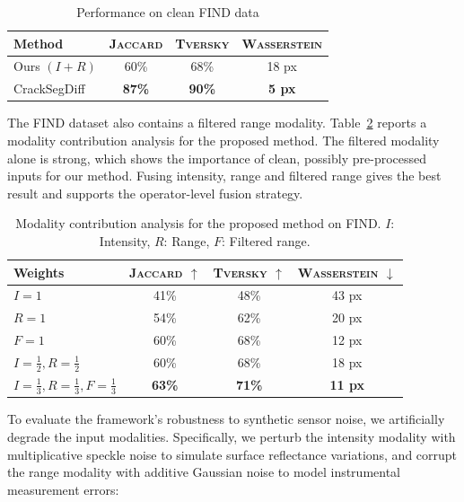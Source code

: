 \documentclass[conference,a4paper]{IEEEtran}
\begin{document}
\begin{table}[!ht]
    \centering
    \caption{Performance on clean FIND data}
    \label{tab:ResultatsClean}
    \begin{tabular}{@{}lccc@{}}
        \toprule
        Method & \textsc{Jaccard} & \textsc{Tversky} & \textsc{Wasserstein} \\
        \midrule
        Ours $(I+R)$ & 60\% & 68\% & 18 px \\
        CrackSegDiff & \textbf{87\%} & \textbf{90\%} & \textbf{5 px} \\
        \bottomrule
    \end{tabular}
\end{table}

The FIND dataset \cite{FIND2022} also contains a filtered range modality. Table~\ref{tab:ResultatsAblation} reports a modality contribution analysis for the proposed method. The filtered modality alone is strong, which shows the importance of clean, possibly pre-processed inputs for our method. Fusing intensity, range and filtered range gives the best result and supports the operator-level fusion strategy.


\begin{table}[!tb]
    \centering
    \caption{Modality contribution analysis for the proposed method on FIND. $I$: Intensity, $R$: Range, $F$: Filtered range.}
    \label{tab:ResultatsAblation}
    \begin{tabular}{@{}lccc@{}}
        \toprule
        Weights & \textsc{Jaccard} $\uparrow$ & \textsc{Tversky} $\uparrow$ & \textsc{Wasserstein} $\downarrow$ \\
        \midrule
        $I=1$ & 41\% & 48\% & 43 px \\
        $R=1$ & 54\% & 62\% & 20 px \\
        $F=1$ & 60\% & 68\% & 12 px \\
        $I=\tfrac12,R=\tfrac12$ & 60\% & 68\% & 18 px \\
        $I=\tfrac13,R=\tfrac13,F=\tfrac13$ & \textbf{63\%} & \textbf{71\%} & \textbf{11 px} \\
        \bottomrule
    \end{tabular}
\end{table}


To evaluate the framework's robustness to synthetic sensor noise, we artificially degrade the input modalities. Specifically, we perturb the intensity modality with multiplicative speckle noise to simulate surface reflectance variations, and corrupt the range modality with additive Gaussian noise to model instrumental measurement errors:
\end{document}
